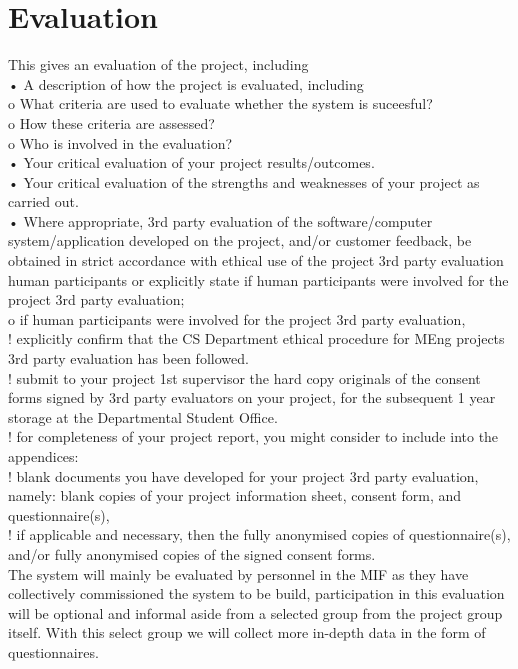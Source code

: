 \chapter{Evaluation}
\label{ch:evaluation}

This gives an evaluation of the project, including \\
• A description of how the project is evaluated, including \\
o What criteria are used to evaluate whether the system is suceesful? \\
o How these criteria are assessed? \\
o Who is involved in the evaluation? \\
• Your critical evaluation of your project results/outcomes. \\
• Your critical evaluation of the strengths and weaknesses of your project as carried out. \\
• Where appropriate, 3rd party evaluation of the software/computer
system/application developed on the project, and/or customer feedback, be
obtained in strict accordance with ethical use of the project 3rd party evaluation human participants or explicitly state if human participants were involved for the project 3rd party evaluation; \\
o if human participants were involved for the project 3rd party evaluation, \\
! explicitly confirm that the CS Department ethical procedure for MEng
projects 3rd party evaluation has been followed. \\
! submit to your project 1st supervisor the hard copy originals of the
consent forms signed by 3rd party evaluators on your project, for the
subsequent 1 year storage at the Departmental Student Office. \\
! for completeness of your project report, you might consider to include
into the appendices: \\
! blank documents you have developed for your project 3rd
party evaluation, namely: blank copies of your project
information sheet, consent form, and questionnaire(s), \\
! if applicable and necessary, then the fully anonymised copies
of questionnaire(s), and/or fully anonymised copies of the
signed consent forms. \\

The system will mainly be evaluated by personnel in the MIF as they have collectively commissioned the system to be build, participation in this evaluation will be optional and informal aside from a selected group from the project group itself. With this select group we will collect more in-depth data in the form of questionnaires. \\